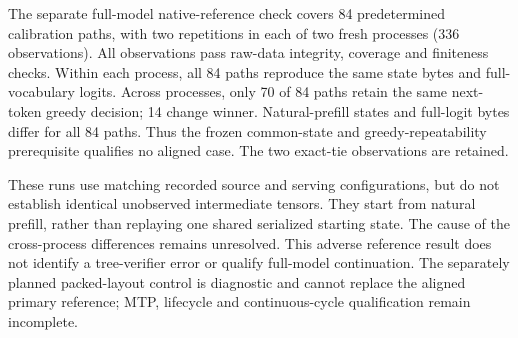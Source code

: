 The separate full-model native-reference check covers 84 predetermined calibration
paths, with two repetitions in each of two fresh processes (336 observations).
All observations pass raw-data integrity, coverage and finiteness checks. Within
each process, all 84 paths reproduce the same state bytes and full-vocabulary
logits. Across processes, only 70 of 84 paths retain the same next-token greedy
decision; 14 change winner. Natural-prefill states and full-logit bytes differ for
all 84 paths. Thus the frozen common-state and greedy-repeatability prerequisite
qualifies no aligned case. The two exact-tie observations are retained.

These runs use matching recorded source and serving configurations, but do not
establish identical unobserved intermediate tensors. They start from natural
prefill, rather than replaying one shared serialized starting state. The cause
of the cross-process differences remains unresolved. This adverse reference
result does not identify a tree-verifier error or qualify full-model
continuation. The separately planned packed-layout control is diagnostic and
cannot replace the aligned primary reference; MTP, lifecycle and continuous-cycle
qualification remain incomplete.
